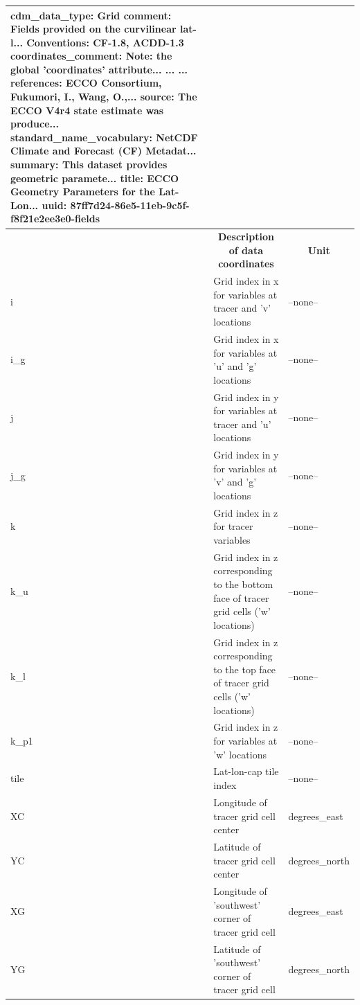 \begin{longtable}{|m{}|m{}|m{}|}
{    cdm_data_type:                   Grid
    comment:                         Fields provided on the curvilinear lat-l...
    Conventions:                     CF-1.8, ACDD-1.3
    coordinates_comment:             Note: the global 'coordinates' attribute...
    ...                              ...
    references:                      ECCO Consortium, Fukumori, I., Wang, O.,...
    source:                          The ECCO V4r4 state estimate was produce...
    standard_name_vocabulary:        NetCDF Climate and Forecast (CF) Metadat...
    summary:                         This dataset provides geometric paramete...
    title:                           ECCO Geometry Parameters for the Lat-Lon...
    uuid:                            87ff7d24-86e5-11eb-9c5f-f8f21e2ee3e0-fields} \\ 
\hline \endhead \hline \endfoot
\rowcolor{lightgray} \multicolumn{1}{|c|}{\textbf{Coordinates}} & \multicolumn{1}{|c|}{\textbf{Description of data coordinates}} &  \multicolumn{1}{|c|}{\textbf{Unit}}\\ \hline
i &Grid index in x for variables at tracer and 'v' locations &--none--  \\ \hline
i\_g &Grid index in x for variables at 'u' and 'g' locations &--none--  \\ \hline
j &Grid index in y for variables at tracer and 'u' locations &--none--  \\ \hline
j\_g &Grid index in y for variables at 'v' and 'g' locations &--none--  \\ \hline
k &Grid index in z for tracer variables &--none--  \\ \hline
k\_u &Grid index in z corresponding to the bottom face of tracer grid cells ('w' locations) &--none--  \\ \hline
k\_l &Grid index in z corresponding to the top face of tracer grid cells ('w' locations) &--none--  \\ \hline
k\_p1 &Grid index in z for variables at 'w' locations &--none--  \\ \hline
tile &Lat-lon-cap tile index &--none--  \\ \hline
XC &Longitude of tracer grid cell center &degrees\_east  \\ \hline
YC &Latitude of tracer grid cell center &degrees\_north  \\ \hline
XG &Longitude of 'southwest' corner of tracer grid cell &degrees\_east  \\ \hline
YG &Latitude of 'southwest' corner of tracer grid cell &degrees\_north  \\ \hline

\end{longtable}

